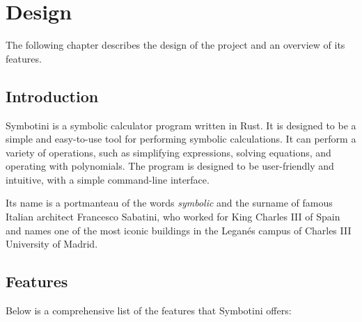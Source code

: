 \chapter{Design}\label{chap:design}

The following chapter describes the design of the project and an overview of its features.

\section{Introduction}\label{sec:introduction}

Symbotini is a symbolic calculator program written in Rust. It is designed to be a simple and easy-to-use tool for performing symbolic calculations. It can perform a variety of operations, such as simplifying expressions, solving equations, and operating with polynomials. The program is designed to be user-friendly and intuitive, with a simple command-line interface.

Its name is a portmanteau of the words \textit{symbolic} and the surname of famous Italian architect Francesco Sabatini, who worked for King Charles III of Spain and names one of the most iconic buildings in the Leganés campus of Charles III University of Madrid.

\section{Features}\label{sec:features}

Below is a comprehensive list of the features that Symbotini offers:

